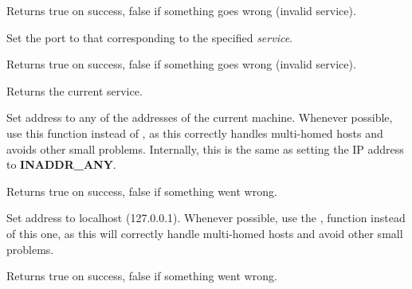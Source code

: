 
Returns true on success, false if something goes wrong
(invalid service).


Set the port to that corresponding to the specified {\it service}.


Returns true on success, false if something goes wrong
(invalid service).


Returns the current service.

%
%

\label{wxipv4addressanyaddress}


Set address to any of the addresses of the current machine. Whenever
possible, use this function instead of ,
as this correctly handles multi-homed hosts and avoids other small
problems. Internally, this is the same as setting the IP address
to {\bf INADDR\_ANY}.


Returns true on success, false if something went wrong.

%
%

\label{wxipv4addresslocalhost}


Set address to localhost (127.0.0.1). Whenever possible, use the 
,
function instead of this one, as this will correctly handle multi-homed
hosts and avoid other small problems.


Returns true on success, false if something went wrong.


